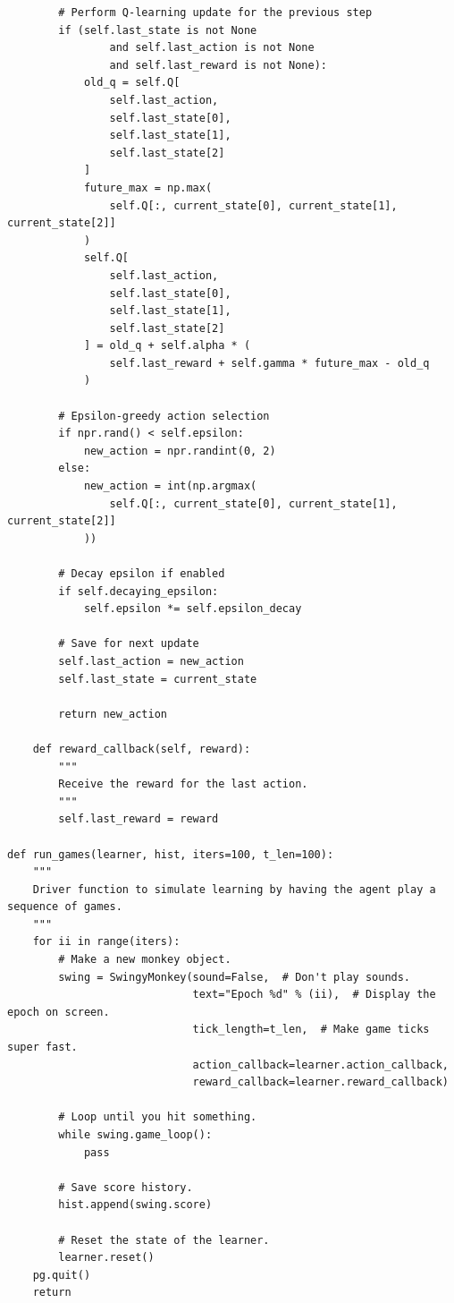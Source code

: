 \documentclass[submit]{../harvardml}
\begin{document}
\begin{lstlisting}
        # Perform Q-learning update for the previous step
        if (self.last_state is not None
                and self.last_action is not None
                and self.last_reward is not None):
            old_q = self.Q[
                self.last_action,
                self.last_state[0],
                self.last_state[1],
                self.last_state[2]
            ]
            future_max = np.max(
                self.Q[:, current_state[0], current_state[1], current_state[2]]
            )
            self.Q[
                self.last_action,
                self.last_state[0],
                self.last_state[1],
                self.last_state[2]
            ] = old_q + self.alpha * (
                self.last_reward + self.gamma * future_max - old_q
            )

        # Epsilon-greedy action selection
        if npr.rand() < self.epsilon:
            new_action = npr.randint(0, 2)
        else:
            new_action = int(np.argmax(
                self.Q[:, current_state[0], current_state[1], current_state[2]]
            ))

        # Decay epsilon if enabled
        if self.decaying_epsilon:
            self.epsilon *= self.epsilon_decay

        # Save for next update
        self.last_action = new_action
        self.last_state = current_state

        return new_action

    def reward_callback(self, reward):
        """
        Receive the reward for the last action.
        """
        self.last_reward = reward

def run_games(learner, hist, iters=100, t_len=100):
    """
    Driver function to simulate learning by having the agent play a sequence of games.
    """
    for ii in range(iters):
        # Make a new monkey object.
        swing = SwingyMonkey(sound=False,  # Don't play sounds.
                             text="Epoch %d" % (ii),  # Display the epoch on screen.
                             tick_length=t_len,  # Make game ticks super fast.
                             action_callback=learner.action_callback,
                             reward_callback=learner.reward_callback)

        # Loop until you hit something.
        while swing.game_loop():
            pass

        # Save score history.
        hist.append(swing.score)

        # Reset the state of the learner.
        learner.reset()
    pg.quit()
    return


\end{lstlisting}
\end{document}
